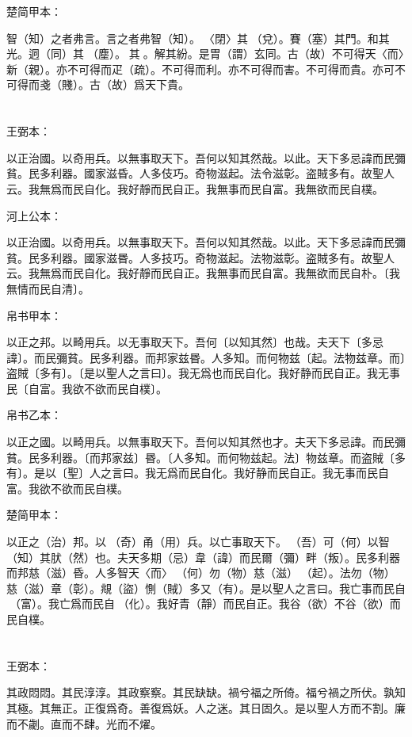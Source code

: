 \documentclass[a5paper]{ctexbook}
\begin{document}
    楚简甲本：

    智（知）之者弗言。言之者弗智（知）。𨳮〈閉〉其𨓚（兌）。賽（塞）其門。和其光。迵（同）其󶴤（塵）。󶴤其󶩴。解其紛。是胃（謂）玄同。古（故）不可得天〈而〉新（親）。亦不可得而疋（疏）。不可得而利。亦不可得而害。不可得而貴。亦可不可得而戔（賤）。古（故）爲天下貴。

    \chapter{}
    王弼本：

    以正治國。以奇用兵。以無事取天下。吾何以知其然哉。以此。天下多忌諱而民彌貧。民多利器。國家滋昏。人多伎巧。奇物滋起。法令滋彰。盗賊多有。故聖人云。我無爲而民自化。我好靜而民自正。我無事而民自富。我無欲而民自樸。

    河上公本：

    以正治國。以奇用兵。以無事取天下。吾何以知其然哉。以此。天下多忌諱而民彌貧。民多利器。國家滋昬。人多技巧。奇物滋起。法物滋彰。盗賊多有。故聖人云。我無爲而民自化。我好靜而民自正。我無事而民自富。我無欲而民自朴。〔我無情而民自清〕。

    帛书甲本：

    以正之邦。以畸用兵。以无事取天下。吾何〔以知其然〕也哉。夫天下〔多忌諱〕。而民彌貧。民多利器。而邦家兹昬。人多知。而何物兹〔起。法物兹章。而〕盗賊〔多有〕。〔是以聖人之言曰〕。我无爲也而民自化。我好静而民自正。我无事民〔自富。我欲不欲而民自樸〕。

    帛书乙本：

    以正之國。以畸用兵。以無事取天下。吾何以知其然也才。夫天下多忌諱。而民彌貧。民多利器。〔而邦家兹〕昬。〔人多知。而何物兹起。法〕物兹章。而盗賊〔多有〕。是以〔聖〕人之言曰。我无爲而民自化。我好静而民自正。我无事而民自富。我欲不欲而民自樸。

    楚简甲本：

    以正之（治）邦。以󶵊（奇）甬（用）兵。以亡事取天下。󼾲（吾）可（何）以智（知）其肰（然）也。夫天多期（忌）韋（諱）而民爾（彌）畔（叛）。民多利器而邦慈（滋）昏。人多智天〈而〉𢦪（何）勿（物）慈（滋）󶵋（起）。法勿（物）慈（滋）章（彰）。覜（盜）惻（賊）多又（有）。是以聖人之言曰。我亡事而民自󶵌（富）。我亡爲而民自󶵍（化）。我好青（靜）而民自正。我谷（欲）不谷（欲）而民自樸。

    \chapter{}
    王弼本：

    其政悶悶。其民淳淳。其政察察。其民缺缺。禍兮福之所倚。福兮禍之所伏。孰知其極。其無正。正復爲奇。善復爲妖。人之迷。其日固久。是以聖人方而不割。廉而不劌。直而不肆。光而不燿。
\end{document}
